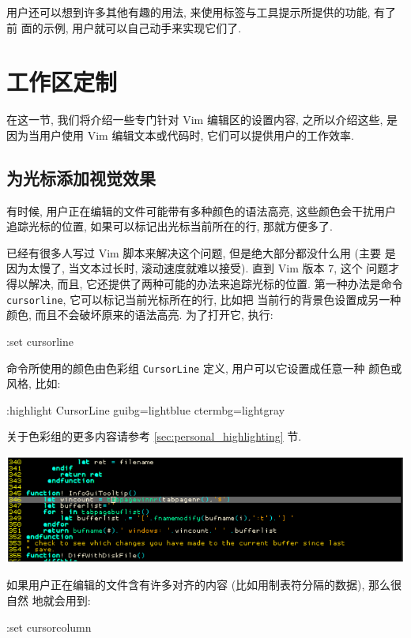 \begin{warning}
用户还可以想到许多其他有趣的用法, 来使用标签与工具提示所提供的功能, 有了前
面的示例, 用户就可以自己动手来实现它们了.

\section{工作区定制}
\label{sec:work_area_personalization}

在这一节, 我们将介绍一些专门针对 Vim 编辑区的设置内容, 之所以介绍这些,
是因为当用户使用 Vim 编辑文本或代码时, 它们可以提供用户的工作效率.

\subsection{为光标添加视觉效果}
\label{subsec:adding_a_more_visual_cursor}
有时候, 用户正在编辑的文件可能带有多种颜色的语法高亮, 这些颜色会干扰用户
追踪光标的位置, 如果可以标记出光标当前所在的行, 那就方便多了.

已经有很多人写过 Vim 脚本来解决这个问题, 但是绝大部分都没什么用 (主要 
是因为太慢了, 当文本过长时, 滚动速度就难以接受). 直到 Vim 版本 7, 这个 
问题才得以解决, 而且, 它还提供了两种可能的办法来追踪光标的位置.
第一种办法是命令 \texttt{cursorline}, 它可以标记当前光标所在的行, 比如把
当前行的背景色设置成另一种颜色, 而且不会破坏原来的语法高亮. 为了打开它,
执行:
\begin{vimcmd}
:set cursorline
\end{vimcmd}
命令所使用的颜色由色彩组 \texttt{CursorLine} 定义, 用户可以它设置成任意一种
颜色或风格, 比如:
\begin{vimcmd}
:highlight CursorLine guibg=lightblue ctermbg=lightgray
\end{vimcmd}
关于色彩组的更多内容请参考 \ref{sec:personal_highlighting} 节.

\begin{center}
    \includegraphics[scale=0.6]{./images/page38-1.png}
\end{center}

如果用户正在编辑的文件含有许多对齐的内容 (比如用制表符分隔的数据), 那么很自然
地就会用到:
\begin{vimcmd}
:set cursorcolumn
\end{vimcmd}


\end{warning}
